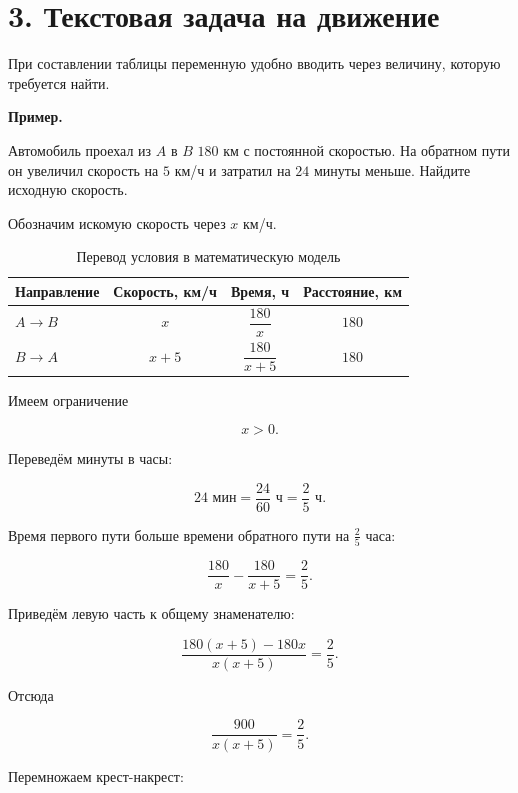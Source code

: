 \documentclass[a4paper,12pt]{article}
\begin{document}

\section*{\textcolor{darkaccent}{
3. Текстовая задача на движение
}}

При составлении таблицы переменную удобно вводить
через величину, которую требуется найти.

\textbf{Пример.}

Автомобиль проехал из \(A\) в \(B\) \(180\) км
с постоянной скоростью.
На обратном пути он увеличил скорость на \(5\) км/ч
и затратил на \(24\) минуты меньше.
Найдите исходную скорость.

Обозначим искомую скорость через \(x\) км/ч.

\begin{table}[h]
\centering
\caption{Перевод условия в математическую модель}

\begin{tabularx}{0.92\linewidth}{@{}lccc@{}}
\toprule
Направление
&
Скорость, км/ч
&
Время, ч
&
Расстояние, км
\\
\midrule

\(A\to B\)
&
\(x\)
&
\(\dfrac{180}{x}\)
&
\(180\)
\\[0.25cm]

\(B\to A\)
&
\(x+5\)
&
\(\dfrac{180}{x+5}\)
&
\(180\)
\\

\bottomrule
\end{tabularx}
\end{table}

Имеем ограничение

\[
x>0.
\]

Переведём минуты в часы:

\[
24\text{ мин}
=
\frac{24}{60}\text{ ч}
=
\frac25\text{ ч}.
\]

Время первого пути больше времени обратного пути на
\(\frac25\) часа:

\[
\frac{180}{x}
-
\frac{180}{x+5}
=
\frac25.
\]

Приведём левую часть к общему знаменателю:

\[
\frac{180(x+5)-180x}{x(x+5)}
=
\frac25.
\]

Отсюда

\[
\frac{900}{x(x+5)}
=
\frac25.
\]

Перемножаем крест-накрест:
\end{document}
